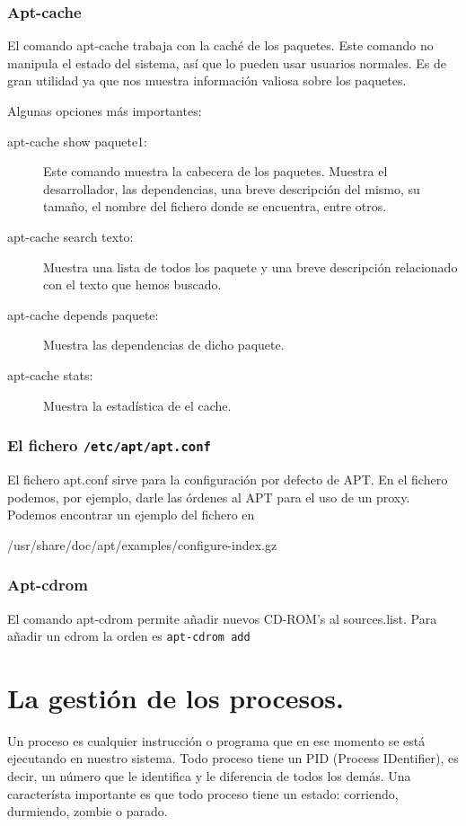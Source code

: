 \subsubsection{Apt-cache}
El  comando apt-cache  trabaja  con  la caché  de  los paquetes.  Este
comando no  manipula el  estado del  sistema, así  que lo  pueden usar
usuarios normales. Es de gran  utilidad ya que nos muestra información
valiosa sobre los paquetes.

Algunas opciones más importantes:

\begin{description}

\item [apt-cache show  paquete1:] Este comando muestra  la cabecera de
los paquetes.  Muestra el  desarrollador, las dependencias,  una breve
descripción  del mismo,  su tamaño,  el  nombre del  fichero donde  se
encuentra, entre otros.

\item [apt-cache search texto:] Muestra una lista de todos los paquete y
una breve descripción relacionado con el texto que hemos buscado.

\item  [apt-cache depends  paquete:] Muestra  las dependencias  de dicho
paquete.

\item [apt-cache stats:] Muestra la estadística de el cache.

\end{description}

\subsubsection{El fichero {\tt /etc/apt/apt.conf}}
El fichero apt.conf sirve para la configuración por defecto de APT. En
el fichero podemos, por ejemplo, darle  las órdenes al APT para el uso
de  un  proxy.  Podemos  encontrar  un ejemplo  del  fichero  en  {\tt

/usr/share/doc/apt/examples/configure-index.gz}

\subsubsection{Apt-cdrom}
El comando  apt-cdrom permite añadir nuevos  CD-ROM's al sources.list.
Para añadir un cdrom la orden es {\tt apt-cdrom add}


\section{La gestión de los procesos.}
Un proceso es  cualquier instrucción o programa que en  ese momento se
está ejecutando en nuestro sistema. Todo proceso tiene un PID (Process
IDentifier), es decir, un número que  le identifica y le diferencia de
todos los demás. Una característa importante es que todo proceso tiene
un estado: corriendo, durmiendo, zombie o parado.

